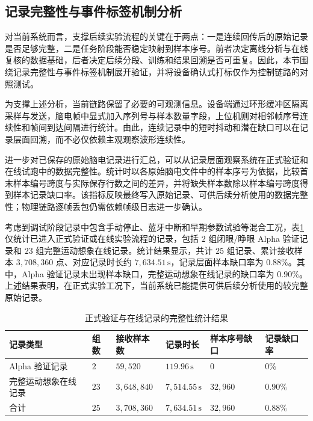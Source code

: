 \subsection{记录完整性与事件标签机制分析}

对当前系统而言，支撑后续实验流程的关键在于两点：一是连续回传后的原始记录是否足够完整，二是任务阶段能否稳定映射到样本序号。前者决定离线分析与在线复核的数据基础，后者决定后续分段、训练和结果回溯是否可重复。因此，本节围绕记录完整性与事件标签机制展开验证，并将设备确认式打标仅作为控制链路的对照测试。

为支撑上述分析，当前链路保留了必要的可观测信息。设备端通过环形缓冲区隔离采样与发送，脑电帧中显式加入序列号与样本数量字段，上位机则对相邻帧序号连续性和帧间到达间隔进行统计。由此，连续记录中的短时抖动和潜在缺口可以在记录层面回溯，而不必仅依赖主观观察波形连续性。

进一步对已保存的原始脑电记录进行汇总，可以从记录层面观察系统在正式验证和在线试跑中的数据完整性。统计时以各原始脑电文件中的样本序号为依据，比较首末样本编号跨度与实际保存行数之间的差异，并将缺失样本数除以样本编号跨度得到样本记录缺口率。该指标反映最终写入原始记录、可供后续分析使用的数据完整性；物理链路逐帧丢包仍需依赖帧级日志进一步确认。

考虑到调试阶段记录中包含手动停止、蓝牙中断和早期参数试验等混合工况，表\ref{tab:c3_record_continuity}仅统计已进入正式验证或在线实验流程的记录，包括 $2$ 组闭眼/睁眼 Alpha 验证记录和 $23$ 组完整运动想象在线记录。统计结果显示，共计 $25$ 组记录、累计接收样本 $3{,}708{,}360$ 点、对应记录时长约 $7{,}634.51\,\mathrm{s}$，记录层面样本缺口率为 $0.88\%$。其中，Alpha 验证记录未出现样本缺口，完整运动想象在线记录的缺口率为 $0.90\%$。上述结果表明，在正式实验工况下，当前系统已能提供可供后续分析使用的较完整原始记录。

\begin{table}[htbp]
    \centering
    \caption{正式验证与在线记录的完整性统计结果}
    \label{tab:c3_record_continuity}
    \scriptsize
    \renewcommand{\arraystretch}{1.18}
    \setlength{\tabcolsep}{4pt}
    \begin{tabular}{p{2.8cm}p{1.0cm}p{2.0cm}p{1.8cm}p{1.9cm}p{1.6cm}}
        \toprule[1.5pt]
        记录类型 & 组数 & 接收样本数 & 记录时长 & 样本序号缺口 & 记录缺口率 \\
        \midrule[1pt]
        Alpha 验证记录 & $2$ & $59{,}520$ & $119.96\,\mathrm{s}$ & $0$ & $0\%$ \\
        完整运动想象在线记录 & $23$ & $3{,}648{,}840$ & $7{,}514.55\,\mathrm{s}$ & $32{,}960$ & $0.90\%$ \\
        合计 & $25$ & $3{,}708{,}360$ & $7{,}634.51\,\mathrm{s}$ & $32{,}960$ & $0.88\%$ \\
        \bottomrule[1.5pt]
    \end{tabular}
\end{table}

